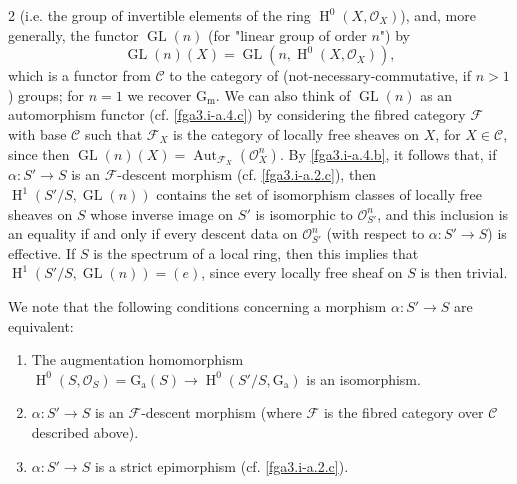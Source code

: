 \begin{example}{2}
    (i.e. the group of invertible elements of the ring \(\operatorname {H}^0(X,\mathscr {O}_X)\)), and, more generally, the functor \(\operatorname {GL}(n)\) (for "linear group of order \(n\)") by
    \[       \operatorname {GL}(n)(X)       = \operatorname {GL}(n,\operatorname {H}^0(X,\mathscr {O}_X)),     \]
    which is a functor from \(\mathcal {C}\) to the category of (not-necessary-commutative, if \(n>1\)) groups;
    for \(n=1\) we recover \(\operatorname {G_m}\).
    We can also think of \(\operatorname {GL}(n)\) as an automorphism functor (cf. \cref{fga3.i-a.4.c}) by considering the fibred category \(\mathcal {F}\) with base \(\mathcal {C}\) such that \(\mathcal {F}_X\) is the category of locally free sheaves on \(X\), for \(X\in \mathcal {C}\), since then \(\operatorname {GL}(n)(X)=\operatorname {Aut}_{\mathcal {F}_X}(\mathscr {O}_X^n)\).
    By \cref{fga3.i-a.4.b}, it follows that, if \(\alpha \colon  S'\to  S\) is an \(\mathcal {F}\)-descent morphism (cf. \cref{fga3.i-a.2.c}), then \(\operatorname {H}^1(S'/S,\operatorname {GL}(n))\) contains the set of isomorphism classes of locally free sheaves on \(S\) whose inverse image on \(S'\) is isomorphic to \(\mathscr {O}_{S'}^n\), and this inclusion is an equality if and only if every descent data on \(\mathscr {O}_{S'}^n\) (with respect to \(\alpha \colon  S'\to  S\)) is effective.
    If \(S\) is the spectrum of a local ring, then this implies that \(\operatorname {H}^1(S'/S,\operatorname {GL}(n))=(e)\), since every locally free sheaf on \(S\) is then trivial.\par{}We note that the following conditions concerning a morphism \(\alpha \colon  S'\to  S\) are equivalent:

    
 \begin{enumerate}
      
 \item[i.]
        The augmentation homomorphism \(\operatorname {H}^0(S,\mathscr {O}_S) = \operatorname {G_a}(S)\to \operatorname {H}^0(S'/S,\operatorname {G_a})\) is an isomorphism.
      

      
 \item[ii.]
        \(\alpha \colon  S'\to  S\) is an \(\mathcal {F}\)-descent morphism (where \(\mathcal {F}\) is the fibred category over \(\mathcal {C}\) described above).
      

      
 \item[iii.]
        \(\alpha \colon  S'\to  S\) is a strict epimorphism (cf. \cref{fga3.i-a.2.c}).
      


\end{enumerate}
\end{example}
